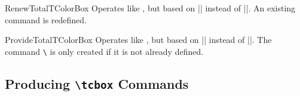 \begin{docCommand}{RenewTotalTColorBox}{}
  Operates like , but based on |\RenewDocumentCommand| instead of |\DeclareDocumentCommand|.
  An existing command is redefined.
\end{docCommand}

\begin{docCommand}{ProvideTotalTColorBox}{}
  Operates like , but based on |\ProvideDocumentCommand| instead of |\DeclareDocumentCommand|.
  The command \texttt{\textbackslash} is only created if it is not already defined.
\end{docCommand}



\clearpage
\subsection{Producing \texttt{\textbackslash tcbox} Commands}\label{subsec:macros_tcbox}

